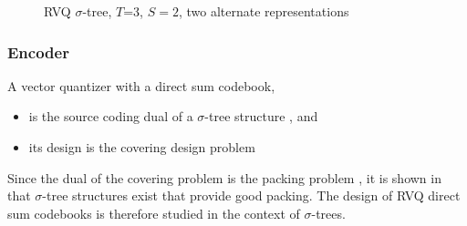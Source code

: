\begin{Body}
\begin{figure}[ht]
	\centering	
	\caption{RVQ $\sigma$-tree, $T$=3, $S=2$, two alternate representations} 
	\label{fig:RVQ_sigma_tree}				
\end{figure}



\subsubsection{Encoder}
A vector quantizer with a direct sum codebook,

\begin{itemize}
\item is the source coding dual of a $\sigma$-tree structure \cite{1993_sigmaTrees_Barnes}, and
\item its design is the covering design problem
\end{itemize}

Since the dual of the covering problem is the packing problem \cite{BOOK_spheres_Conway}, it is shown in \cite{1993_sigmaTrees_Barnes} that $\sigma$-tree structures exist that provide good packing.  The design of RVQ direct sum codebooks is therefore studied in the context of $\sigma$-trees.


\end{Body}
